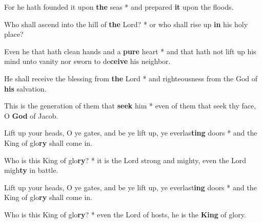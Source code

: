 \begin{multicols}{2}
	For he hath founded it upon \textbf{the} seas * and prepared \textbf{it} upon the floods.
	
	Who shall ascend into the hill of \textbf{the} Lord? * or who shall rise up \textbf{in} his holy place?
	
	Even he that hath clean hands and a \textbf{pure} heart * and that hath not lift up his mind unto vanity nor sworn to de\textbf{ceive} his neighbor.
	
	He shall receive the blessing from \textbf{the} Lord * and righteousness from the God of \textbf{his} salvation.
	
	This is the generation of them that \textbf{seek} him * even of them that seek thy face, O \textbf{God} of Jacob.
	
	Lift up your heads, O ye gates, and be ye lift up, ye everlas\textbf{ting} doors * and the King of glo\textbf{ry} shall come in.
	
	Who is this King of glo\textbf{ry}? * it is the Lord strong and mighty, even the Lord migh\textbf{ty} in battle.
	
	Lift up your heads, O ye gates, and be ye lift up, ye everlast\textbf{ing} doors * and the King of glo\textbf{ry} shall come in.
	
	Who is this King of glo\textbf{ry}? * even the Lord of hosts, he is the \textbf{King} of glory.
\end{multicols}
